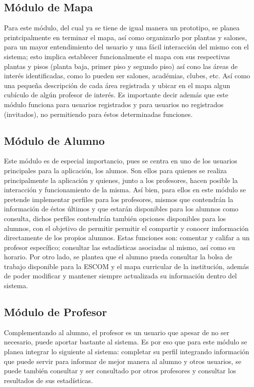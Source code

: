 \subsection{Módulo de Mapa}
\noindent
Para este módulo, del cual ya se tiene de igual manera un prototipo, se planea printcipalmente en terminar el mapa, así como organizarlo por plantas y salones, para un mayor entendimiento del usuario y una fácil interacción del mismo con el sistema; esto implica establecer funcionalmente el mapa con sus respectivas plantas y pisos (planta baja, primer piso y segundo piso) así cono las áreas de interés identificadas, como lo pueden ser salones, académias, clubes, etc. Así como una pequeña descripción de cada área registrada y ubicar en el mapa algun cubículo de algún profesor de interés. Es importante decir además que este módulo funciona para usuarios registrados y para usuarios no registrados (invitados), no permitiendo para éstos determinadas funciones. \\

\subsection{Módulo de Alumno}
\noindent
Este módulo es de especial importancio, pues se centra en uno de los usuarios principales para la aplicación, los alumos. Son ellos para quienes se realiza principalmente la aplicación y quienes, junto a los profesores, hacen posible la interacción y funcionamiento de la misma. Así bien, para ellos en este módulo se pretende implementar perfiles para los profesores, mismos que contendrán la información de éstos últimos y que estarán disponibles para los alumnos como consulta, dichos perfiles contendrán también opciones disponibles para los alumnos, con el objetivo de permitir permitir el compartir y conocer imformación directamente de los propios alumnos. Estas funciones son: comentar y califar a un profesor específico; consultar las estadísticas asociadas al mismo, así como su horario. Por otro lado, se plantea que el alumno pueda consultar la bolsa de trabajo disponible para la ESCOM y el mapa curricular de la institución, además de poder modificar y mantener siempre actualizada su información dentro del sistema. \\

\subsection{Módulo de Profesor}
\noindent
Complementando al alumno, el profesor es un usuario que apesar de no ser necesario, puede aportar bastante al sistema. Es por eso que para este módulo se planea integrar lo siguiente al sistema: completar su perfil integrando información que puede servir para informar de mejor manera al alumno y otros usuarios, se puede también consultar y ser consultado por otros profesores y consultar los resultados de sus estadísticas.\\

